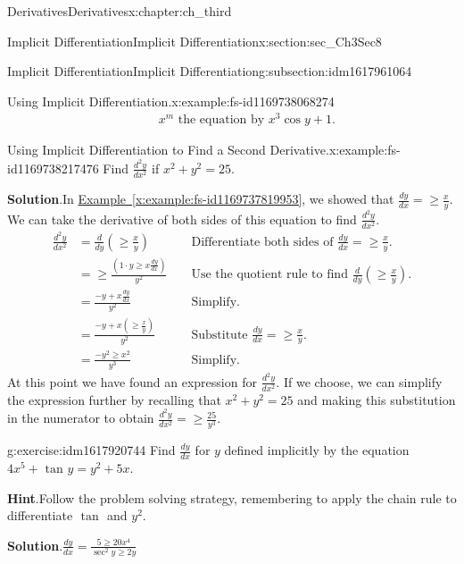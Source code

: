 \documentclass[oneside,10pt,]{book}
\newcommand{\blocktitlefont}{\relax}
\newcommand{\xreffont}{\relax}
\numberwithin{equation}{section}
\newcommand{\amp}{&}
\begin{document}
\begin{chapterptx}{Derivatives}{}{Derivatives}{}{}{x:chapter:ch_third}
\begin{sectionptx}{Implicit Differentiation}{}{Implicit Differentiation}{}{}{x:section:sec_Ch3Sec8}
\begin{subsectionptx}{Implicit Differentiation}{}{Implicit Differentiation}{}{}{g:subsection:idm1617961064}
\begin{example}{Using Implicit Differentiation.}{x:example:fs-id1169738068274}
\begin{align*}
\amp \amp \amp x^m \text{ the equation by } x^3\cos  y+1.
\end{align*}
\end{example}
\begin{example}{Using Implicit Differentiation to Find a Second Derivative.}{x:example:fs-id1169738217476}%
Find \(\frac{d^2y}{dx^2}\) if \(x^2+y^2=25.\)%
\par\smallskip%
\noindent\textbf{\blocktitlefont Solution}.\hypertarget{g:solution:idm1617923688}{}\quad{}In \hyperref[x:example:fs-id1169737819953]{Example~{\xreffont\ref{x:example:fs-id1169737819953}}}, we showed that \(\frac{dy}{dx}=\geq \frac{x}{y}.\) We can take the derivative of both sides of this equation to find \(\frac{d^2y}{dx^2}.\)%
%
\begin{align*}
\frac{d^2y}{dx^2}\amp=\frac{d}{dy}(\geq \frac{x}{y})\amp\amp\text{ Differentiate both sides of } \frac{dy}{dx}=\geq \frac{x}{y}.\\
\amp =\geq \frac{(1\cdot y\geq x\frac{dy}{dx})}{y^2}\amp\amp \text{ Use the quotient rule to find } \frac{d}{dy}(\geq \frac{x}{y}).\\
\amp =\frac{-y+x\frac{dy}{dx}}{y^2}\amp \amp \text{ Simplify. }\\
\amp =\frac{-y+x(\geq \frac{x}{y})}{y^2}\amp\amp \text{ Substitute } \frac{dy}{dx}=\geq \frac{x}{y}.\\
\amp =\frac{-y^2\geq x^2}{y^3}\amp\amp \text{ Simplify. }
\end{align*}
At this point we have found an expression for \(\frac{d^2y}{dx^2}.\) If we choose, we can simplify the expression further by recalling that \(x^2+y^2=25\) and making this substitution in the numerator to obtain \(\frac{d^2y}{dx^2}=\geq \frac{25}{y^3}.\)%
\end{example}
\begin{inlineexercise}{}{g:exercise:idm1617920744}%
Find \(\frac{dy}{dx}\) for \(y\) defined implicitly by the equation \(4x^5+\text{ tan } y=y^2+5x.\)%
\par\smallskip%
\noindent\textbf{\blocktitlefont Hint}.\hypertarget{g:hint:idm1617915624}{}\quad{}Follow the problem solving strategy, remembering to apply the chain rule to differentiate \(\text{ tan }\) and \(y^2.\)%
\par\smallskip%
\noindent\textbf{\blocktitlefont Solution}.\hypertarget{g:solution:idm1617916392}{}\quad{}\(\frac{dy}{dx}=\frac{5\geq 20x^4}{\sec^2y\geq 2y}\)%
\end{inlineexercise}%
\end{subsectionptx}
%
%
\typeout{************************************************}

\end{sectionptx}
\end{chapterptx}
\end{document}
